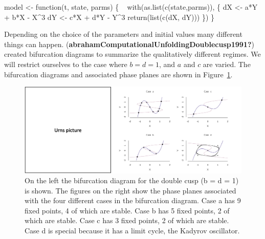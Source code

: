 \documentclass[
  a4paper,
  DIV=11,
  numbers=noendperiod]{scrreprt}
\newenvironment{Shaded}{\begin{snugshade}}{\end{snugshade}}
\newcommand{\ControlFlowTok}[1]{\textcolor[rgb]{0.00,0.23,0.31}{#1}}
\newcommand{\DecValTok}[1]{\textcolor[rgb]{0.68,0.00,0.00}{#1}}
\newcommand{\FunctionTok}[1]{\textcolor[rgb]{0.28,0.35,0.67}{#1}}
\newcommand{\NormalTok}[1]{\textcolor[rgb]{0.00,0.23,0.31}{#1}}
\newcommand{\OtherTok}[1]{\textcolor[rgb]{0.00,0.23,0.31}{#1}}
\newcommand{\SpecialCharTok}[1]{\textcolor[rgb]{0.37,0.37,0.37}{#1}}
\begin{document}
\begin{Shaded}
\begin{Highlighting}[]
\NormalTok{model }\OtherTok{\textless{}{-}} \ControlFlowTok{function}\NormalTok{(t, state, parms) \{   }
  \FunctionTok{with}\NormalTok{(}\FunctionTok{as.list}\NormalTok{(}\FunctionTok{c}\NormalTok{(state,parms)), \{}
\NormalTok{    dX }\OtherTok{\textless{}{-}}\NormalTok{ a}\SpecialCharTok{*}\NormalTok{Y }\SpecialCharTok{+}\NormalTok{ b}\SpecialCharTok{*}\NormalTok{X }\SpecialCharTok{{-}}\NormalTok{ X}\SpecialCharTok{\^{}}\DecValTok{3} 
\NormalTok{    dY }\OtherTok{\textless{}{-}}\NormalTok{ c}\SpecialCharTok{*}\NormalTok{X }\SpecialCharTok{+}\NormalTok{ d}\SpecialCharTok{*}\NormalTok{Y }\SpecialCharTok{{-}}\NormalTok{ Y}\SpecialCharTok{\^{}}\DecValTok{3}
    \FunctionTok{return}\NormalTok{(}\FunctionTok{list}\NormalTok{(}\FunctionTok{c}\NormalTok{(dX, dY))) }
\NormalTok{  \})}
\NormalTok{\}}
\end{Highlighting}
\end{Shaded}

Depending on the choice of the parameters and initial values many
different things can happen.
(\textbf{abrahamComputationalUnfoldingDoublecusp1991?}) created
bifurcation diagrams to summarize the qualitatively different regimes.
We will restrict ourselves to the case where \(b = d = 1\), and \(a\)
and \(c\) are varied. The bifurcation diagrams and associated phase
planes are shown in Figure~\ref{fig-ch4n-img16-old-64}.

\begin{figure}

{\centering \includegraphics{media/ch4n/fig-ch4n-img16-old-64.png}

}

\caption{\label{fig-ch4n-img16-old-64}On the left the bifurcation
diagram for the double cusp (b = d = 1) is shown. The figures on the
right show the phase planes associated with the four different cases in
the bifurcation diagram. Case a has 9 fixed points, 4 of which are
stable. Case b has 5 fixed points, 2 of which are stable. Case c has 3
fixed points, 2 of which are stable. Case d is special because it has a
limit cycle, the Kadyrov oscillator.}

\end{figure}
\end{document}
